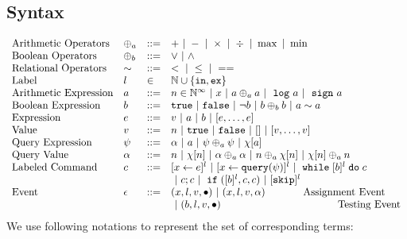 %
%
\subsection{Syntax}
\[
\begin{array}{llll}
\mbox{Arithmetic Operators} 
& \oplus_a & ::= & + ~|~ - ~|~ \times 
%
~|~ \div ~|~ \max ~|~ \min\\  
\mbox{Boolean Operators} 
& \oplus_b & ::= & \lor ~|~ \land
\\
%
\mbox{Relational Operators} 
& \sim & ::= & < ~|~ \leq ~|~ == 
\\  
%
\mbox{Label} 
& l & \in & \mathbb{N} \cup \{\lin, \lex\} 
\\ 
%
\mbox{Arithmetic Expression} 
& \aexpr & ::= & 
n \in \mathbb{N}^{\infty} ~|~ {x} ~|~ \aexpr \oplus_a \aexpr 
 ~|~ \elog \aexpr  ~|~ \esign \aexpr
\\
%
\mbox{Boolean Expression} & \bexpr & ::= & 
%
\etrue ~|~ \efalse  ~|~ \neg \bexpr
 ~|~ \bexpr \oplus_b \bexpr
%
~|~ \aexpr \sim \aexpr 
\\
%
\mbox{Expression} & \expr & ::= & v ~|~ \aexpr ~|~ \bexpr ~|~ [\expr, \dots, \expr]
\\  
%
\mbox{Value} 
& v & ::= & { n ~|~ \etrue ~|~ \efalse ~|~ [] ~|~ [v, \dots, v]}  
\\
%
\mbox{Query Expression} 
& {\qexpr} & ::= 
& { \qval ~|~ \aexpr ~|~ \qexpr \oplus_a \qexpr ~|~ \chi[\aexpr]} 
\\
%
\mbox{Query Value} & \qval & ::= 
& {n ~|~ \chi[n] ~|~ \qval \oplus_a  \qval ~|~ n \oplus_a  \chi[n]
    ~|~ \chi[n] \oplus_a  n}
    \\
\mbox{Labeled Command} 
& {c} & ::= &   [\assign {{x}}{ {\expr}}]^{l} ~|~  [\assign {{x} } {{\query(\qexpr)}}]^{l}
~|~ {\ewhile [ \bexpr ]^{l} \edo {c} }
\\
&&&
~|~ {c};{c}  
~|~ \eif([\bexpr]{}^l , {c}, {c}) 
~|~ [\eskip]^l\\ 
\mbox{Event} 
& \event & ::= & 
    ({x}, l, v, \bullet) ~|~ ({x}, l, v, \qval)  ~~~~~~~~~~~ \mbox{Assignment Event} \\
&&& ~|~(\bexpr, l, v, \bullet)   ~~~~~~~~~~~~~~~~~~~~~~~~~~~~~~~~~~ \mbox{Testing Event}
\\
\end{array}
\]
We use following notations to represent the set of corresponding terms:
